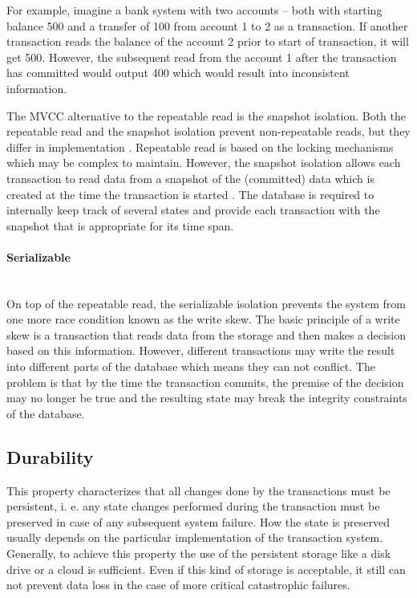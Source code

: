 \documentclass[oneside,
  digital, %
  table,   %
  nolof,     %
  nolot,     %
]{fithesis3}
\newcommand{\newlinepar}[1]{\paragraph{#1}\needspace{4\baselineskip}\mbox{}\\}
\begin{document}
For example, imagine a bank system with two accounts -- both with starting balance 500 and a transfer of 100 from account 1 to 2 as a transaction. If another transaction reads the balance of the account 2 prior to start of transaction, it will get 500. However, the subsequent read from the account 1 after the transaction has committed would output 400 which would result into inconsistent information.

The MVCC alternative to the repeatable read is the snapshot isolation. Both the repeatable read and the snapshot isolation prevent non-repeatable reads, but they differ in implementation \cite{isolation_levels}. Repeatable read is based on the locking mechanisms which may be complex to maintain. However, the snapshot isolation allows each transaction to read data from a snapshot of the (committed) data which is created at the time the transaction is started \cite{ansi-sql-critique}. The database is required to internally keep track of several states and provide each transaction with the snapshot that is appropriate for its time span.

\newlinepar{Serializable}

On top of the repeatable read, the serializable isolation prevents the system from one more race condition known as the write skew. The basic principle of a write skew is a transaction that reads data from the storage and then makes a decision based on this information. However, different transactions may write the result into different parts of the database which means they can not conflict. The problem is that by the time the transaction commits, the premise of the decision may no longer be true and the resulting state may break the integrity constraints of the database.

\subsection{Durability}

This property characterizes that all changes done by the transactions must be persistent, i. e. any state changes performed during the transaction must be preserved in case of any subsequent system failure. How the state is preserved usually depends on the particular implementation of the transaction system. Generally, to achieve this property the use of the persistent storage like a disk drive or a cloud is sufficient. Even if this kind of storage is acceptable, it still can not prevent data loss in the case of more critical catastrophic failures.
\end{document}
